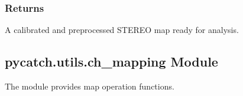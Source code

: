 \documentclass[letterpaper,10pt,english]{sphinxmanual}
\begin{document}
\begin{fulllineitems}
\begin{description}
\end{description}


\subsubsection{Returns}
\label{\detokenize{pycatch/utils/calibration:id6}}\begin{description}
\sphinxAtStartPar
A calibrated and preprocessed STEREO map ready for analysis.

\end{description}

\end{fulllineitems}


\sphinxstepscope


\subsection{pycatch.utils.ch\_mapping Module}
\label{\detokenize{pycatch/utils/ch_mapping:pycatch-utils-ch-mapping-module}}\label{\detokenize{pycatch/utils/ch_mapping::doc}}
\sphinxAtStartPar
The  module provides map operation functions.

\label{\detokenize{pycatch/utils/ch_mapping:module-pycatch.utils.ch_mapping}}
\end{document}
